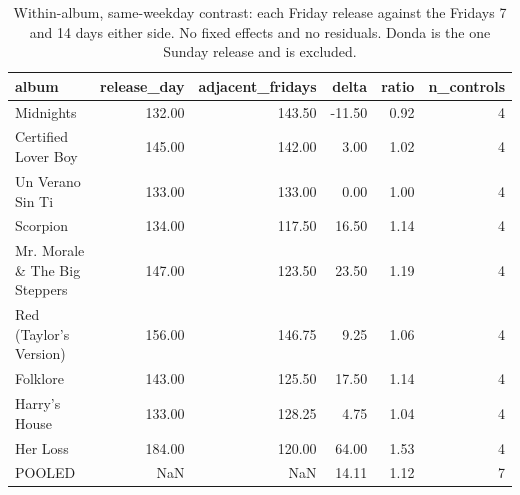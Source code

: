 \begin{table}
\caption{Within-album, same-weekday contrast: each Friday release against the Fridays 7 and 14 days either side. No fixed effects and no residuals. Donda is the one Sunday release and is excluded.}
\begin{tabular}{lrrrrr}
\toprule
album & release\_day & adjacent\_fridays & delta & ratio & n\_controls \\
\midrule
Midnights & 132.00 & 143.50 & -11.50 & 0.92 & 4 \\
Certified Lover Boy & 145.00 & 142.00 & 3.00 & 1.02 & 4 \\
Un Verano Sin Ti & 133.00 & 133.00 & 0.00 & 1.00 & 4 \\
Scorpion & 134.00 & 117.50 & 16.50 & 1.14 & 4 \\
Mr. Morale \& The Big Steppers & 147.00 & 123.50 & 23.50 & 1.19 & 4 \\
Red (Taylor's Version) & 156.00 & 146.75 & 9.25 & 1.06 & 4 \\
Folklore & 143.00 & 125.50 & 17.50 & 1.14 & 4 \\
Harry's House & 133.00 & 128.25 & 4.75 & 1.04 & 4 \\
Her Loss & 184.00 & 120.00 & 64.00 & 1.53 & 4 \\
POOLED & NaN & NaN & 14.11 & 1.12 & 7 \\
\bottomrule
\end{tabular}
\end{table}
